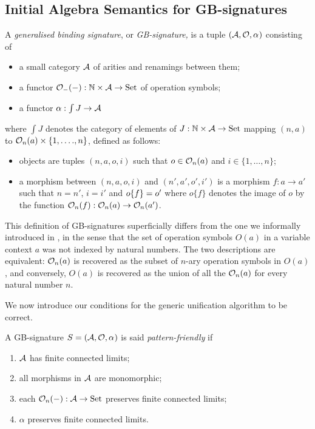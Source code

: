 \subsection{Initial Algebra Semantics for GB-signatures}

\label{subsec:GB-sig}
\begin{definition}
\label{def:GB-signature}A \emph{generalised binding signature}, or
\emph{GB-signature, }is a tuple $({\cal A},\indexedO,\ntharvecfunct)$
consisting of
\begin{itemize}
\item a small category ${\cal A}$ of arities and renamings between them;
\item a functor $\Oop --:\mathbb{N}\times{\cal A}\rightarrow\Set$ of operation
symbols;
\item a functor $\alpha:\int J\rightarrow{\cal A}$
\end{itemize}
where $\int J$ denotes the category of elements of $J:\mathbb{N}\times{\cal A}\rightarrow\Set$
mapping $(n,a)$ to $\Oop na\times\{1,\dots.,n\}$, defined as follows:
\begin{itemize}
\item objects are tuples $(n,a,o,i)$ such that $o\in\Oop na$ and $i\in\{1,\dots,n\}$;
\item a morphism between $(n,a,o,i)$ and $(n',a',o',i')$ is a morphism
$f:a\rightarrow a'$ such that $n=n'$, $i=i'$ and $\rename of=o'$
where $o\{f\}$ denotes the image of $o$ by the function $\Oop nf:\Oop na\rightarrow\Oop n{a'}$.
\end{itemize}
\end{definition}
\begin{remark}
This definition of GB-signatures superficially differs from the one
we informally introduced in , in the sense
that the set of operation symbols $O(a)$ in a variable context $a$
was not indexed by natural numbers. The two descriptions are equivalent:
$\Oop na$ is recovered as the subset of $n$-ary operation symbols
in $O(a)$, and conversely, $O(a)$ is recovered as the union of all
the $\Oop na$ for every natural number $n$.
\end{remark}
We now introduce our conditions for the generic unification algorithm
to be correct.
\begin{definition}
\label{def:pattern-friendly}A GB-signature $S=({\cal A},\indexedO,\ntharvecfunct)$
is said \emph{pattern-friendly }if 
\begin{enumerate}
\item ${\cal A}$ has finite connected limits;
\item all morphisms in ${\cal A}$ are monomorphic;
\item each $\Oop n-:{\cal A}\rightarrow\Set$ preserves finite connected
limits;
\item $\alpha$ preserves finite connected limits.
\end{enumerate}
\end{definition}
